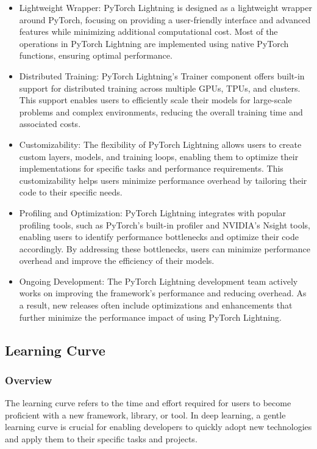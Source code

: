 \documentclass[12pt]{article}
\begin{document}
\begin{itemize}
    \item Lightweight Wrapper: PyTorch Lightning is designed as a lightweight wrapper around PyTorch, focusing on providing a user-friendly interface and advanced features while minimizing additional computational cost. Most of the operations in PyTorch Lightning are implemented using native PyTorch functions, ensuring optimal performance.
    \item Distributed Training: PyTorch Lightning's Trainer component offers built-in support for distributed training across multiple GPUs, TPUs, and clusters. This support enables users to efficiently scale their models for large-scale problems and complex environments, reducing the overall training time and associated costs.
    \item Customizability: The flexibility of PyTorch Lightning allows users to create custom layers, models, and training loops, enabling them to optimize their implementations for specific tasks and performance requirements. This customizability helps users minimize performance overhead by tailoring their code to their specific needs.
    \item Profiling and Optimization: PyTorch Lightning integrates with popular profiling tools, such as PyTorch's built-in profiler and NVIDIA's Nsight tools, enabling users to identify performance bottlenecks and optimize their code accordingly. By addressing these bottlenecks, users can minimize performance overhead and improve the efficiency of their models.
    \item Ongoing Development: The PyTorch Lightning development team actively works on improving the framework's performance and reducing overhead. As a result, new releases often include optimizations and enhancements that further minimize the performance impact of using PyTorch Lightning.
\end{itemize}

\subsection{Learning Curve}

\subsubsection{Overview}

The learning curve refers to the time and effort required for users to become proficient with a new framework, library, or tool. In deep learning, a gentle learning curve is crucial for enabling developers to quickly adopt new technologies and apply them to their specific tasks and projects.
\end{document}
